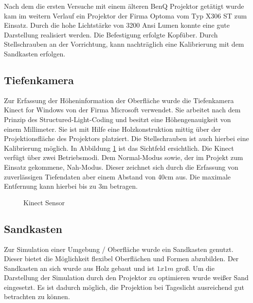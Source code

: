 \begin{Spacing}{\mylinespace}
Nach dem die ersten Versuche mit einem älteren BenQ Projektor getätigt wurde kam im weitern Verlauf ein Projektor der Firma Optoma vom Typ X306 ST zum Einsatz. Durch die hohe Lichtstärke von 3200 Ansi Lumen konnte eine gute Darstellung realisiert werden. Die Befestigung erfolgte Kopfüber. Durch Stellschrauben an der Vorrichtung, kann nachträglich eine Kalibrierung mit dem Sandkasten erfolgen.

\subsection{Tiefenkamera}

Zur Erfassung der Höheninformation der Oberfläche wurde die Tiefenkamera Kinect for Windows von der Firma Microsoft verwendet. Sie arbeitet nach dem Prinzip des Structured-Light-Coding und besitzt eine Höhengenauigkeit von einem Millimeter. Sie ist mit Hilfe eine Holzkonstruktion mittig über der Projektionsfläche des Projektors platziert. Die Stellschrauben ist auch hierbei eine Kalibrierung möglich. In Abbildung \ref{fig:fov} ist das Sichtfeld ersichtlich. Die Kinect verfügt über zwei Betriebsmodi. Dem Normal-Modus sowie, der im Projekt zum Einsatz gekommene, Nah-Modus. Dieser zeichnet sich durch die Erfassung von zuverlässigen Tiefendaten aber einem Abstand von 40cm aus. Die maximale Entfernung kann hierbei bis zu 3m betragen.

\begin{figure}[h!]
	\centering
	\vspace{0.2cm}
	\caption{Kinect Sensor}
		\label{fig:fov}
\end{figure}

\subsection{Sandkasten}

Zur Simulation einer Umgebung / Oberfläche wurde ein Sandkasten genutzt. Dieser bietet die Möglichkeit flexibel Oberflächen und Formen abzubilden. Der Sandkasten an sich wurde aus Holz gebaut und ist $1x1m$ groß. Um die Darstellung der Simulation durch den Projektor zu optimieren wurde weißer Sand eingesetzt. Es ist dadurch möglich, die Projektion bei Tageslicht ausreichend gut betrachten zu können.

\end{Spacing}
\newpage
\clearpage
